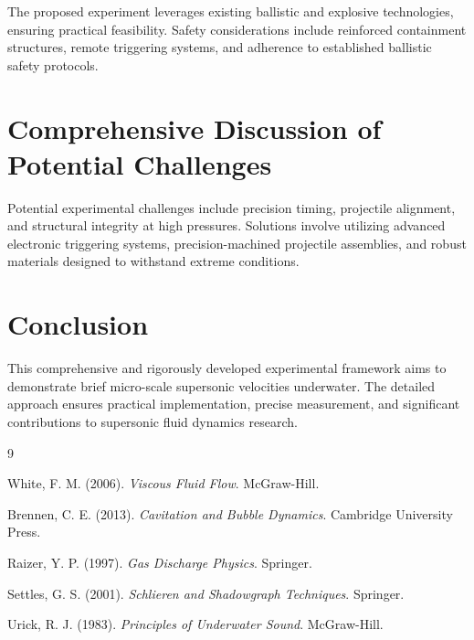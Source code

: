 \documentclass{article}
\begin{document}
The proposed experiment leverages existing ballistic and explosive technologies, ensuring practical feasibility. Safety considerations include reinforced containment structures, remote triggering systems, and adherence to established ballistic safety protocols.

\section{Comprehensive Discussion of Potential Challenges}

Potential experimental challenges include precision timing, projectile alignment, and structural integrity at high pressures. Solutions involve utilizing advanced electronic triggering systems, precision-machined projectile assemblies, and robust materials designed to withstand extreme conditions.

\section{Conclusion}

This comprehensive and rigorously developed experimental framework aims to demonstrate brief micro-scale supersonic velocities underwater. The detailed approach ensures practical implementation, precise measurement, and significant contributions to supersonic fluid dynamics research.


\begin{thebibliography}{9}

White, F. M. (2006). \textit{Viscous Fluid Flow}. McGraw-Hill.

Brennen, C. E. (2013). \textit{Cavitation and Bubble Dynamics}. Cambridge University Press.

Raizer, Y. P. (1997). \textit{Gas Discharge Physics}. Springer.

Settles, G. S. (2001). \textit{Schlieren and Shadowgraph Techniques}. Springer.

Urick, R. J. (1983). \textit{Principles of Underwater Sound}. McGraw-Hill.

\end{thebibliography}
\end{document}
